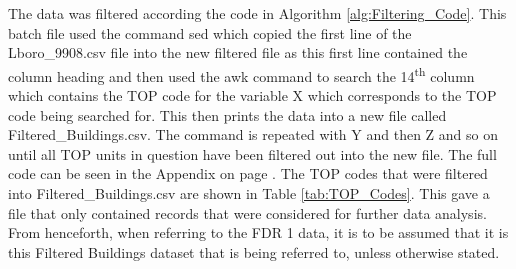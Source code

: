 \documentclass[table,a4paper,oneside]{book}
\begin{document}
The data was filtered according the code in Algorithm \ref{alg:Filtering_Code}. This batch file used the command sed which copied the first line of the Lboro\_9908.csv file into the new filtered file as this first line contained the column heading and then used the awk command to search the 14\textsuperscript{th} column which contains the TOP code for the variable X which corresponds to the TOP code being searched for. This then prints the data into a new file called Filtered\_Buildings.csv. The command is repeated with Y and then Z and so on until all TOP units in question have been filtered out into the new file. The full code can be seen in the Appendix on page \pageref{code:FDR1_Data}. The  TOP codes that were filtered into Filtered\_Buildings.csv are shown in Table \ref{tab:TOP_Codes}. This gave a file that only contained records that were considered for further data analysis. From henceforth, when referring to the FDR 1 data, it is to be assumed that it is this Filtered Buildings dataset that is being referred to, unless otherwise stated.
\end{document}
